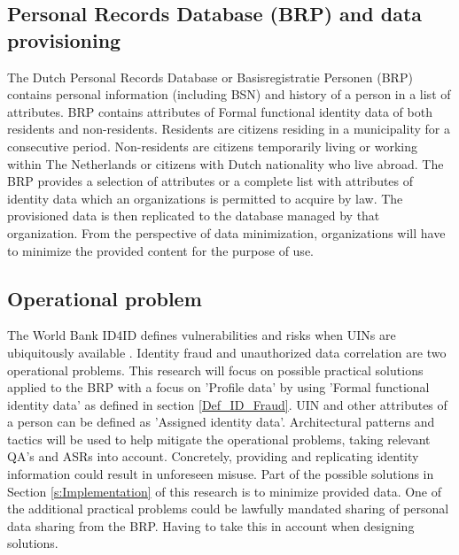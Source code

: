 \subsection{Personal Records Database (BRP) and data provisioning}\label{BRP}
The Dutch Personal Records Database or Basisregistratie Personen (BRP) contains personal information (including BSN) and history of a person in a list of attributes. BRP contains attributes of Formal functional identity data of both residents and non-residents. Residents are citizens residing in a municipality for a consecutive period. Non-residents are citizens temporarily living or working within The Netherlands or citizens with Dutch nationality who live abroad. \cite{BRP} The BRP provides a selection of attributes or a complete list with attributes of identity data which an organizations is permitted to acquire by law. The provisioned data is then replicated to the database managed by that organization. From the perspective of data minimization, organizations will have to minimize the provided content for the purpose of use.  

\subsection{Operational problem}\label{OP}
The World Bank ID4ID defines vulnerabilities and risks when UINs are ubiquitously available \cite{WorldBank_protecting}. Identity fraud and unauthorized data correlation are two operational problems. This research will focus on possible practical solutions applied to the BRP with a focus  on 'Profile data' by using 'Formal functional identity data' as defined in section \ref{Def_ID_Fraud}. UIN and other attributes of a person can be defined as 'Assigned identity data'. Architectural patterns and tactics will be used to help mitigate the operational problems, taking relevant QA's and ASRs into account. Concretely, providing and replicating identity information could result in unforeseen misuse. Part of the possible solutions in Section \ref{s:Implementation} of this research is to minimize provided data. One of the additional practical problems could be lawfully mandated sharing of personal data sharing from the BRP. Having to take this in account when designing solutions.